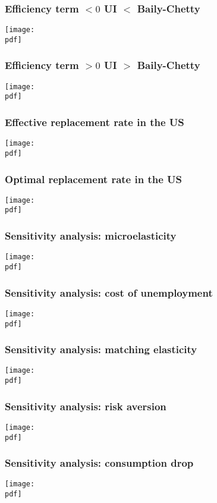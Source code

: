 \documentclass[12pt,xcolor={dvipsnames},hyperref={pdftex,pdfpagemode=UseNone,hidelinks,pdfdisplaydoctitle=true},usepdftitle=false]{beamer}
\def\pdf{xui.pdf}
\begin{document}
\begin{frame}
\frametitle{Efficiency term $<0$ \so UI $<$ Baily-Chetty}
\texttt{[image: \\pdf]}%
\end{frame}

\begin{frame}
\frametitle{Efficiency term $>0$ \so UI $>$ Baily-Chetty}
\texttt{[image: \\pdf]}%
\end{frame}

\begin{frame}
\frametitle{Effective replacement rate in the US}
\texttt{[image: \\pdf]}%
\end{frame}

\begin{frame}
\frametitle{Optimal replacement rate in the US}
\texttt{[image: \\pdf]}%
\end{frame}

\begin{frame}
\frametitle{Sensitivity analysis: microelasticity}
\texttt{[image: \\pdf]}%
\end{frame}


\begin{frame}
\frametitle{Sensitivity analysis: cost of unemployment}
\texttt{[image: \\pdf]}%
\end{frame}


\begin{frame}
\frametitle{Sensitivity analysis: matching elasticity}
\texttt{[image: \\pdf]}%
\end{frame}

\begin{frame}
\frametitle{Sensitivity analysis: risk aversion}
\texttt{[image: \\pdf]}%
\end{frame}

\begin{frame}
\frametitle{Sensitivity analysis: consumption drop}
\texttt{[image: \\pdf]}%
\end{frame}

\begin{frame}
\end{frame}
\end{document}
